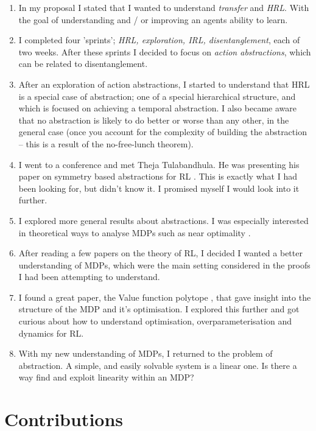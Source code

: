 \begin{enumerate}
  \tightlist
  \item In my proposal I stated that I wanted to understand \textit{transfer} and \textit{HRL}. With the goal of understanding and / or improving an agents ability to learn.
  \item I completed four 'sprints'; \textit{HRL, exploration, IRL, disentanglement}, each of two weeks. After these sprints I decided to focus on \textit{action abstractions},
  which can be related to disentanglement.
  \item After an exploration of action abstractions, I started to understand that HRL is a special case of abstraction; one of a special hierarchical structure, and which is focused on achieving a temporal abstraction. I also became aware that no abstraction is likely to do better or worse than any other, in the general case (once you account for the complexity of building the abstraction -- this is a result of the no-free-lunch theorem).
  \item I went to a conference and met Theja Tulabandhula. He was presenting his paper on symmetry based abstractions for RL \cite{Mahajan2017}. This is exactly what I had been looking for, but didn't know it. I promised myself I would look into it further.
  \item I explored more general results about abstractions. I was especially interested in theoretical ways to analyse MDPs such as near optimality \cite{Abel2017}.
  \item After reading a few papers on the theory of RL, I decided I wanted a better understanding of MDPs, which were the main setting considered in the proofs I had been attempting to understand.
  \item I found a great paper, the Value function polytope \cite{Dadashi2018}, that gave insight into the structure of the MDP and it's optimisation. I explored this further and got curious about how to understand optimisation, overparameterisation and dynamics for RL.
  \item With my new understanding of MDPs, I returned to the problem of abstraction. A simple, and easily solvable system is a linear one. Is there a way find and exploit linearity within an MDP?
\end{enumerate}

\section{Contributions}

